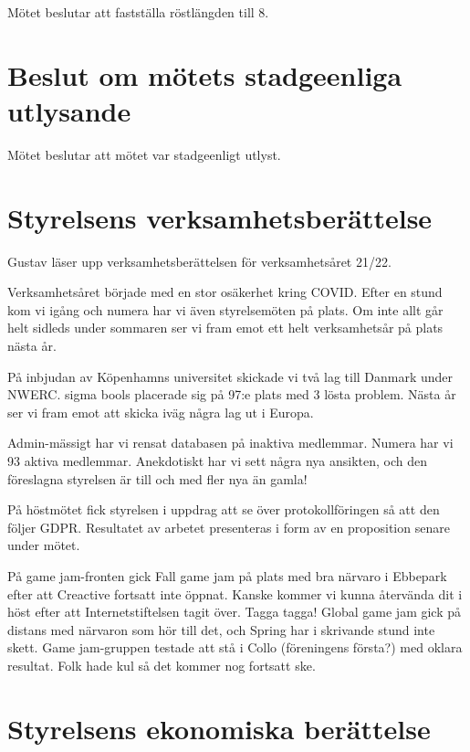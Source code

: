 \documentclass[a4paper]{article}
\newenvironment{quotationb}%
{\begin{leftbar}}%
{\end{leftbar}}
\begin{document}
Mötet beslutar att fastställa röstlängden till 8.

\section{Beslut om mötets stadgeenliga utlysande}

Mötet beslutar att mötet var stadgeenligt utlyst.

\section{Styrelsens verksamhetsberättelse}

Gustav läser upp verksamhetsberättelsen för verksamhetsåret 21/22.

\begin{quotationb}

Verksamhetsåret började med en stor osäkerhet kring COVID. Efter en stund kom vi
    igång och numera har vi även styrelsemöten på plats. Om inte allt går helt
    sidleds under sommaren ser vi fram emot ett helt verksamhetsår på plats
    nästa år.

På inbjudan av Köpenhamns universitet skickade vi två lag till Danmark under
    NWERC. sigma bools placerade sig på 97:e plats med 3 lösta problem. Nästa år
    ser vi fram emot att skicka iväg några lag ut i Europa.

Admin-mässigt har vi rensat databasen på inaktiva medlemmar. Numera har vi 93
    aktiva medlemmar. Anekdotiskt har vi sett några nya ansikten, och den
    föreslagna styrelsen är till och med fler nya än gamla!

På höstmötet fick styrelsen i uppdrag att se över protokollföringen så att den
    följer GDPR. Resultatet av arbetet presenteras i form av en proposition
    senare under mötet.

På game jam-fronten gick Fall game jam på plats med bra närvaro i Ebbepark efter
    att Creactive fortsatt inte öppnat. Kanske kommer vi kunna återvända dit i
    höst efter att Internetstiftelsen tagit över. Tagga tagga! Global game jam
    gick på distans med närvaron som hör till det, och Spring har i skrivande
    stund inte skett. Game jam-gruppen testade att stå i Collo (föreningens
    första?) med oklara resultat. Folk hade kul så det kommer nog fortsatt ske.

\end{quotationb}

\section{Styrelsens ekonomiska berättelse}
\end{document}
